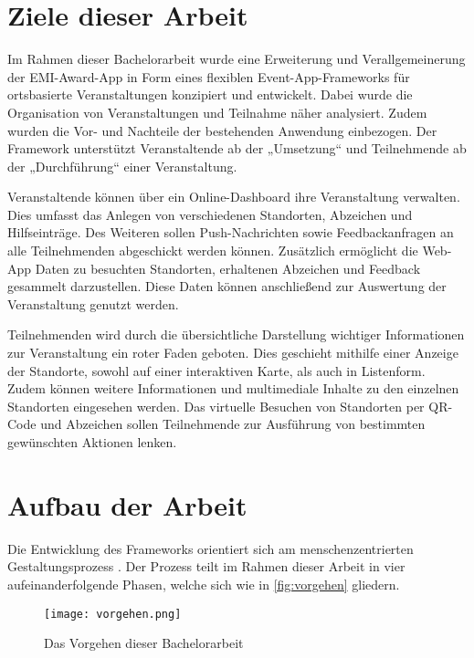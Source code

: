 \section{Ziele dieser Arbeit} \label{sec:goals}

Im Rahmen dieser Bachelorarbeit wurde eine Erweiterung und Verallgemeinerung der
EMI-Award-App in Form eines flexiblen Event-App-Frameworks für ortsbasierte
Veranstaltungen konzipiert und entwickelt. Dabei wurde die Organisation von
Veranstaltungen und Teilnahme näher analysiert. Zudem wurden die Vor- und
Nachteile der bestehenden Anwendung einbezogen. Der Framework unterstützt
Veranstaltende ab der „Umsetzung“ und Teilnehmende ab der „Durchführung“ einer Veranstaltung.

Veranstaltende können über ein Online-Dashboard ihre Veranstaltung verwalten.
Dies umfasst das Anlegen von verschiedenen Standorten, Abzeichen und
Hilfseinträge. Des Weiteren sollen Push-Nachrichten sowie Feedbackanfragen an
alle Teilnehmenden abgeschickt werden können. Zusätzlich ermöglicht die Web-App
Daten zu besuchten Standorten, erhaltenen Abzeichen und Feedback gesammelt
darzustellen. Diese Daten können anschließend zur Auswertung der Veranstaltung
genutzt werden.

Teilnehmenden wird durch die übersichtliche Darstellung wichtiger Informationen
zur Veranstaltung ein roter Faden geboten. Dies geschieht mithilfe einer
Anzeige der Standorte, sowohl auf einer interaktiven Karte, als auch in
Listenform. Zudem können weitere Informationen und multimediale Inhalte zu den
einzelnen Standorten eingesehen werden. Das virtuelle Besuchen von Standorten
per QR-Code und Abzeichen sollen Teilnehmende zur Ausführung von bestimmten
gewünschten Aktionen lenken.

\section{Aufbau der Arbeit}

Die Entwicklung des Frameworks orientiert sich am menschenzentrierten
Gestaltungsprozess . Der Prozess teilt im Rahmen dieser
Arbeit in vier aufeinanderfolgende Phasen, welche sich wie in
\autoref{fig:vorgehen} gliedern.

\begin{figure}[htpb]
    \centering
    \texttt{[image: vorgehen.png]}
    \caption{Das Vorgehen dieser Bachelorarbeit}
    \label{fig:vorgehen}
\end{figure}

